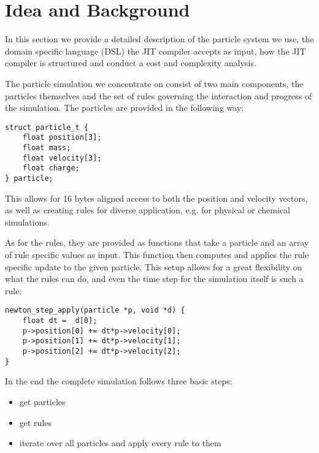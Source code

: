 \section{Idea and Background}\label{sec:background}

In this section we provide a detailed description of the particle system we use, the domain specific language (DSL) the JIT compiler accepts as input, how the JIT compiler is structured and conduct a cost and complexity analysis.

The particle simulation we concentrate on consist of two main components, the particles themselves and the set of rules governing the interaction and progress of the simulation. The particles are provided in the following way:

\noindent\begin{minipage}{\linewidth}
\begin{lstlisting}
struct particle_t {
    float position[3];
    float mass;
    float velocity[3];
    float charge;
} particle;
\end{lstlisting}
\end{minipage}

This allows for 16 bytes aligned access to both the position and velocity vectors, as well as creating rules for diverse application, e.g. for physical or chemical simulations.

As for the rules, they are provided as functions that take a particle and an array of rule specific values as input.
This function then computes and applies the rule specific update to the given particle. This setup allows for a great flexibility on what the rules can do, and even the time step for the simulation itself is such a rule:

\noindent\begin{minipage}{\linewidth}
\begin{lstlisting}
newton_step_apply(particle *p, void *d) {
    float dt =  d[0];
    p->position[0] += dt*p->velocity[0];
    p->position[1] += dt*p->velocity[1];
    p->position[2] += dt*p->velocity[2];
}
\end{lstlisting}
\end{minipage}

In the end the complete simulation follows three basic steps:
\begin{itemize}
\item get particles
\item get rules
\item iterate over all particles and apply every rule to them
\end{itemize}

